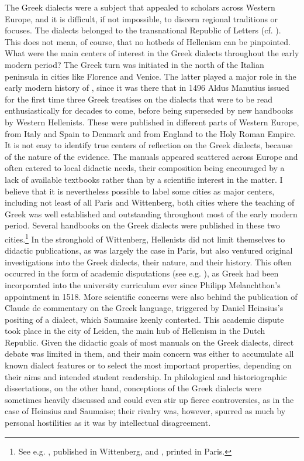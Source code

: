 The Greek dialects were a subject that appealed to scholars across Western Europe, and it is difficult, if not impossible, to discern regional traditions or focuses. The dialects belonged to the transnational Republic of Letters (cf. \citealt{Bots1997}). This does not mean, of course, that no hotbeds of Hellenism can be pinpointed. What were the main centers of interest in the Greek dialects throughout the early modern period? The Greek turn was initiated in the north of the Italian peninsula in cities like Florence and Venice. The latter played a major role in the early modern history of  , since it was there that in 1496 Aldus Manutius issued for the first time three Greek treatises on the dialects that were to be read enthusiastically for decades to come, before being superseded by new handbooks by Western Hellenists. These were published in different parts of Western Europe, from Italy and Spain to Denmark and from England to the Holy Roman Empire. It is not easy to identify true centers of reflection on the Greek dialects, because of the nature of the evidence. The manuals appeared scattered across Europe and often catered to local didactic needs, their composition being encouraged by a lack of available textbooks rather than by a scientific interest in the matter. I believe that it is nevertheless possible to label some cities as major centers, including not least of all Paris and Wittenberg, both cities where the teaching of Greek was well established and outstanding throughout most of the early modern period. Several handbooks on the Greek dialects were published in these two cities.\footnote{See e.g. \citet{Schmidt1604}, published in Wittenberg, and \citet{Merigon1621}, printed in Paris.} In the  stronghold of Wittenberg, Hellenists did not limit themselves to didactic publications, as was largely the case in Paris, but also ventured original investigations into the Greek dialects, their nature, and their history. This often occurred in the form of academic disputations (see e.g. \citealt{Thryllitsch1709}), as Greek had been incorporated into the university curriculum ever since Philipp Melanchthon’s appointment in 1518. More scientific concerns were also behind the publication of Claude de  commentary on the Greek language, triggered by Daniel Heinsius’s positing of a  dialect, which Saumaise keenly contested. This academic dispute took place in the city of Leiden, the main hub of Hellenism in the Dutch Republic. Given the didactic goals of most manuals on the Greek dialects, direct debate was limited in them, and their main concern was either to accumulate all known dialect features or to select the most important properties, depending on their aims and intended student readership. In philological and historiographic dissertations, on the other hand, conceptions of the Greek dialects were sometimes heavily discussed and could even stir up fierce controversies, as in the case of Heinsius and Saumaise; their rivalry was, however, spurred as much by personal hostilities as it was by intellectual disagreement.

